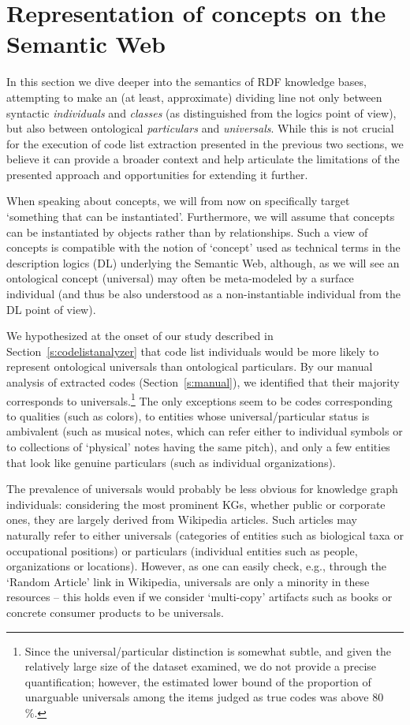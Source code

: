 \section{Representation of concepts on the Semantic Web}
\label{s:repr}

In this section we dive deeper into the semantics of RDF knowledge bases, attempting to make an (at least, approximate) dividing line not only between syntactic \textit{individuals} and \textit{classes} (as distinguished from the logics point of view), but also between ontological \textit{particulars} and \textit{universals}.
While this is not crucial for the execution of code list extraction presented in the previous two sections, we believe it can provide a broader context and help articulate the limitations of the presented approach and opportunities for extending it further.

When speaking about concepts, we will from now on specifically target `something that can be instantiated'.
Furthermore, we will assume that concepts can be instantiated by objects rather than by relationships.
Such a view of concepts is compatible with the notion of `concept' used as technical terms in the description logics (DL) underlying the Semantic Web, although, as we will see an ontological concept (universal) may often be meta-modeled by a surface individual (and thus be also understood as a non-instantiable individual from the DL point of view).

We hypothesized at the onset of our study described in Section~\ref{s:codelistanalyzer} that code list individuals would be more likely to represent ontological universals than ontological particulars.
By our manual analysis of extracted codes (Section~\ref{s:manual}), we identified that their majority corresponds to universals.\footnote{Since the universal/particular distinction is somewhat subtle, and given the relatively large size of the dataset examined, we do not provide a precise quantification; however, the estimated lower bound of the proportion of unarguable universals among the items judged as true codes was above 80 \%.} 
The only exceptions seem to be codes corresponding to qualities (such as colors), to entities whose universal/particular status is ambivalent (such as musical notes, which can refer either to individual symbols or to collections of `physical' notes having the same pitch), and only a few entities that look like genuine particulars (such as individual organizations). 

The prevalence of universals would probably be less obvious for knowledge graph individuals: considering the most prominent KGs, whether public or corporate ones, they are largely derived from Wikipedia articles.
Such articles may naturally refer to either universals (categories of entities such as biological taxa or occupational positions) or particulars (individual entities such as people, organizations or locations).
However, as one can easily check, e.g., through the `Random Article' link in Wikipedia, universals are only a minority in these resources -- this holds even if we consider `multi-copy' artifacts such as books or concrete consumer products to be universals. 

